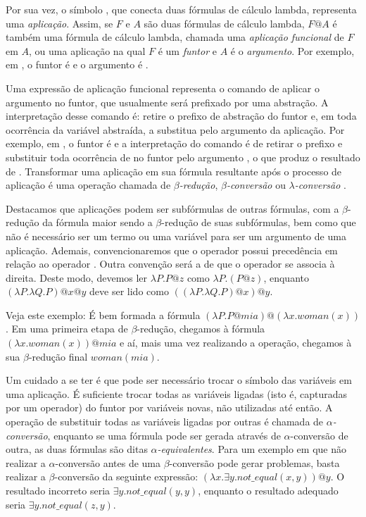 Por sua vez, o símbolo , que conecta duas fórmulas de cálculo lambda, representa uma \textit{aplicação}. Assim, se $F$ e $A$ são duas fórmulas de cálculo lambda, $F@A$ é também uma fórmula de cálculo lambda, chamada uma \textit{aplicação funcional} de $F$ em $A$, ou uma aplicação na qual $F$ é um \textsl{funtor} e $A$ é o \textsl{argumento}. Por exemplo, em , o funtor é  e o argumento é .

Uma expressão de aplicação funcional representa o comando de aplicar o argumento no funtor, que usualmente será prefixado por uma abstração. A interpretação desse comando é: retire o prefixo de abstração do funtor e, em toda ocorrência da variável abstraída, a substitua pelo argumento da aplicação. Por exemplo, em , o funtor é  e a interpretação do comando é de retirar o prefixo  e substituir toda ocorrência de  no funtor pelo argumento , o que produz o resultado de . Transformar uma aplicação em sua fórmula resultante após o processo de aplicação é uma operação chamada de \textit{$\beta$-redução}, \textit{$\beta$-conversão} ou \textit{$\lambda$-conversão} \citep[p.~67]{BlackburnBos:2005}.

Destacamos que aplicações podem ser subfórmulas de outras fórmulas, com a $\beta$-redução da fórmula maior sendo a $\beta$-redução de suas subfórmulas, bem como que não é necessário ser um termo ou uma variável para ser um argumento de uma aplicação. Ademais, convencionaremos que o operador  possui precedência em relação ao operador \code{\lambda}. Outra convenção será a de que o operador  se associa à direita. Deste modo, devemos ler $\lambda P. P@z$ como $\lambda P.(P@z)$, enquanto $(\lambda P. \lambda Q. P)@x@y$ deve ser lido como $((\lambda P. \lambda Q. P)@x)@y$. 

Veja este exemplo:
É bem formada a fórmula $(\lambda P. P@mia)@(\lambda x.woman(x))$. Em uma primeira etapa de $\beta$-redução, chegamos à fórmula $(\lambda x.woman(x))@mia$ e aí, mais uma vez realizando a operação, chegamos à sua $\beta$-redução final $woman(mia)$.

Um cuidado a se ter é que pode ser necessário trocar o símbolo das variáveis em uma aplicação. É suficiente trocar todas as variáveis ligadas (isto é, capturadas por um operador) do funtor por variáveis novas, não utilizadas até então. A operação de substituir todas as variáveis ligadas por outras é chamada de \textit{$\alpha$-conversão}, enquanto se uma fórmula pode ser gerada através de $\alpha$-conversão de outra, as duas fórmulas são ditas \textit{$\alpha$-equivalentes}. Para um exemplo em que não realizar a $\alpha$-conversão antes de uma $\beta$-conversão pode gerar problemas, basta realizar a $\beta$-conversão da seguinte expressão: $(\lambda x .\exists y. not\_equal(x,y)) @ y$. O resultado incorreto seria $\exists y. not\_equal(y,y)$, enquanto o resultado adequado seria $\exists y. not\_equal(z,y)$.

